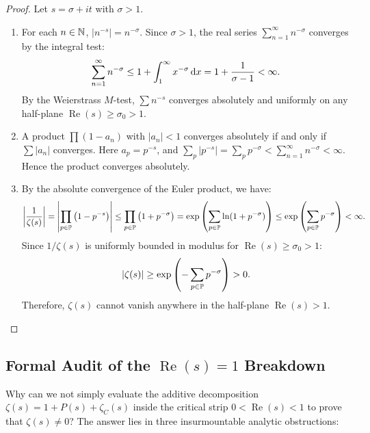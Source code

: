 \begin{proof}
\leanok
Let $s = \sigma + i t$ with $\sigma > 1$.
\begin{enumerate}[label=(\alph*)]
  \item For each $n \in \mathbb{N}$, $|n^{-s}| = n^{-\sigma}$. Since $\sigma > 1$, the real series $\sum_{n=1}^\infty n^{-\sigma}$ converges by the integral test:
  $$\sum_{n=1}^\infty n^{-\sigma} \le 1 + \int_1^\infty x^{-\sigma} \, \mathrm{d} x = 1 + \frac{1}{\sigma - 1} < \infty.$$
  By the Weierstrass $M$-test, $\sum n^{-s}$ converges absolutely and uniformly on any half-plane $\operatorname{Re}(s) \ge \sigma_0 > 1$.
  \item A product $\prod (1 - a_n)$ with $|a_n| < 1$ converges absolutely if and only if $\sum |a_n|$ converges. Here $a_p = p^{-s}$, and $\sum_p |p^{-s}| = \sum_p p^{-\sigma} < \sum_{n=1}^\infty n^{-\sigma} < \infty$. Hence the product converges absolutely.
  \item By the absolute convergence of the Euler product, we have:
  $$\left| \frac{1}{\zeta(s)} \right| = \left| \prod_{p \in \mathbb{P}} \left(1 - p^{-s}\right) \right| \le \prod_{p \in \mathbb{P}} \left(1 + p^{-\sigma}\right) = \exp\left( \sum_{p \in \mathbb{P}} \ln(1 + p^{-\sigma}) \right) \le \exp\left( \sum_{p \in \mathbb{P}} p^{-\sigma} \right) < \infty.$$
  Since $1/\zeta(s)$ is uniformly bounded in modulus for $\operatorname{Re}(s) \ge \sigma_0 > 1$:
  $$|\zeta(s)| \ge \exp\left( -\sum_{p \in \mathbb{P}} p^{-\sigma} \right) > 0.$$
  Therefore, $\zeta(s)$ cannot vanish anywhere in the half-plane $\operatorname{Re}(s) > 1$.
\end{enumerate}
\end{proof}

\subsection{Formal Audit of the $\operatorname{Re}(s) = 1$ Breakdown}

Why can we not simply evaluate the additive decomposition $\zeta(s) = 1 + P(s) + \zeta_C(s)$ inside the critical strip $0 < \operatorname{Re}(s) < 1$ to prove that $\zeta(s) \neq 0$? The answer lies in three insurmountable analytic obstructions:


